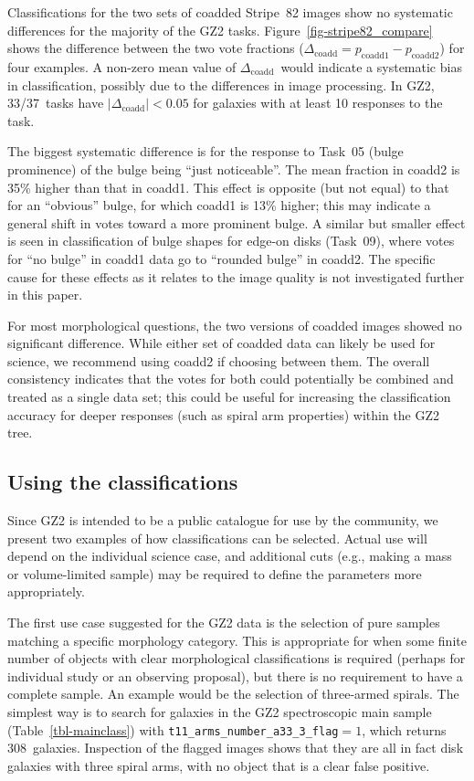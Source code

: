 \documentclass[useAMS,usenatbib]{mn2e}
\newcommand{\dcoadd}{$\Delta_\mathrm{coadd}$}
\begin{document}
Classifications for the two sets of coadded Stripe~82 images show no systematic differences for the majority of the GZ2 tasks. Figure~\ref{fig-stripe82_compare} shows the difference between the two vote fractions ($\Delta_\mathrm{coadd} = p_\mathrm{coadd1} - p_\mathrm{coadd2}$) for four examples. A non-zero mean value of \dcoadd~would indicate a systematic bias in classification, possibly due to the differences in image processing. In GZ2, 33/37~tasks have $|\Delta_\mathrm{coadd}| < 0.05$ for galaxies with at least 10 responses to the task. 

The biggest systematic difference is for the response to Task~05 (bulge prominence) of the bulge being ``just noticeable''. The mean fraction in coadd2 is 35\% higher than that in coadd1. This effect is opposite (but not equal) to that for an ``obvious'' bulge, for which coadd1 is 13\% higher; this may indicate a general shift in votes toward a more prominent bulge. A similar but smaller effect is seen in classification of bulge shapes for edge-on disks (Task~09), where votes for ``no bulge'' in coadd1 data go to ``rounded bulge'' in coadd2. The specific cause for these effects as it relates to the image quality is not investigated further in this paper. 

For most morphological questions, the two versions of coadded images showed no significant difference. While either set of coadded data can likely be used for science, we recommend using coadd2 if choosing between them. The overall consistency indicates that the votes for both could potentially be combined and treated as a single data set; this could be useful for increasing the classification accuracy for deeper responses (such as spiral arm properties) within the GZ2 tree.

\subsection{Using the classifications}\label{ssec-usingdata}

Since GZ2 is intended to be a public catalogue for use by the community, we present two examples of how classifications can be selected. Actual use will depend on the individual science case, and additional cuts (e.g., making a mass or volume-limited sample) may be required to define the parameters more appropriately.

The first use case suggested for the GZ2 data is the selection of pure samples matching a specific morphology category. This is appropriate for when some finite number of objects with clear morphological classifications is required (perhaps for individual study or an observing proposal), but there is no requirement to have a complete sample. An example would be the selection of three-armed spirals. The simplest way is to search for galaxies in the GZ2 spectroscopic main sample (Table~\ref{tbl-mainclass}) with {\tt t11\_arms\_number\_a33\_3\_flag}$ = 1$, which returns 308~galaxies. Inspection of the flagged images shows that they are all in fact disk galaxies with three spiral arms, with no object that is a clear false positive. 
\end{document}
